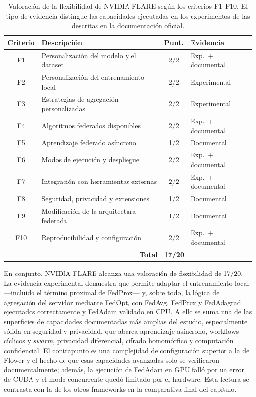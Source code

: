 \begin{table}[htbp]
  \centering
  \caption{Valoración de la flexibilidad de NVIDIA FLARE según los criterios
  F1--F10. El tipo de evidencia distingue las capacidades ejecutadas en los
  experimentos de las descritas en la documentación oficial.}
  \label{tab:flex-nvflare-score}
  \begin{tabular}{clcl}
    \toprule
    \textbf{Criterio} & \textbf{Descripción} & \textbf{Punt.} & \textbf{Evidencia} \\
    \midrule
    F1  & Personalización del modelo y el dataset      & 2/2 & Exp.\ + documental \\
    F2  & Personalización del entrenamiento local      & 2/2 & Experimental \\
    F3  & Estrategias de agregación personalizadas     & 2/2 & Experimental \\
    F4  & Algoritmos federados disponibles             & 2/2 & Exp.\ + documental \\
    F5  & Aprendizaje federado asíncrono               & 1/2 & Documental \\
    F6  & Modos de ejecución y despliegue              & 2/2 & Exp.\ + documental \\
    F7  & Integración con herramientas externas        & 2/2 & Exp.\ + documental \\
    F8  & Seguridad, privacidad y extensiones          & 1/2 & Documental \\
    F9  & Modificación de la arquitectura federada     & 1/2 & Documental \\
    F10 & Reproducibilidad y configuración             & 2/2 & Exp.\ + documental \\
    \midrule
    \multicolumn{2}{r}{\textbf{Total}} & \multicolumn{2}{l}{\textbf{17/20}} \\
    \bottomrule
  \end{tabular}
\end{table}

En conjunto, NVIDIA FLARE alcanza una valoración de flexibilidad de 17/20. La
evidencia experimental
demuestra que permite adaptar el entrenamiento local —incluido el término proximal
de FedProx— y, sobre todo, la lógica de agregación del servidor mediante FedOpt, con
FedAvg, FedProx y FedAdagrad ejecutados correctamente y FedAdam validado en CPU. A
ello se suma una de las superficies de capacidades documentadas más amplias del
estudio, especialmente sólida en seguridad y privacidad, que abarca aprendizaje
asíncrono, workflows cíclicos y \textit{swarm}, privacidad
diferencial, cifrado homomórfico y computación confidencial. El contrapunto es una
complejidad de configuración superior a la de Flower y el hecho de que esas
capacidades avanzadas solo se verificaron documentalmente; además, la ejecución de
FedAdam en GPU falló por un error de CUDA y el modo concurrente quedó limitado por el
hardware. Esta lectura se contrasta con la de los otros frameworks en la comparativa
final del capítulo.

